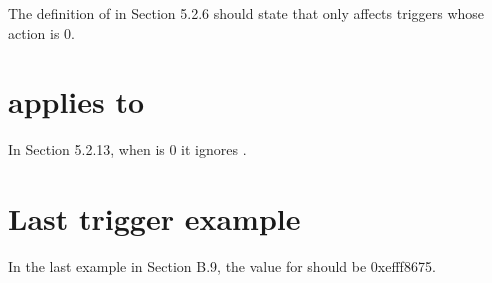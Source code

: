 The definition of \Fmte in Section 5.2.6 should state that \Fmte only affects
triggers whose action is 0.

\section{\Fsselect applies to \Fsvalue}

In Section 5.2.13, when \Fsselect is 0 it ignores \Fsvalue.

\section{Last trigger example}

In the last example in Section B.9, the value for  should be
0xefff8675.
